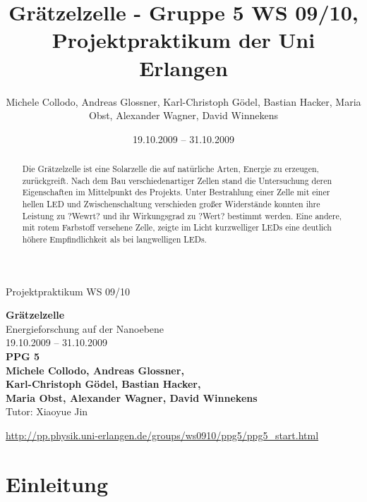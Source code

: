 \documentclass[11pt]{scrartcl}
\title{Gr\"atzelzelle - Gruppe 5 WS 09/10, Projektpraktikum der Uni Erlangen}
\date{19.10.2009 -- 31.10.2009}
\author{Michele Collodo, Andreas Glossner, Karl-Christoph G\"odel, Bastian Hacker, Maria Obst, Alexander Wagner, David Winnekens}
\begin{document}
\sloppy %
\thispagestyle{empty}
\large{Projektpraktikum WS 09/10}
\hfill
{}
\\[8\baselineskip]
\begin{center}
{\Huge\textbf{Gr\"atzelzelle}}
\\[0.5\baselineskip]
{\large Energieforschung auf der Nanoebene}
\\[1.5\baselineskip]
{\Large 19.10.2009 -- 31.10.2009}
\\[6\baselineskip]
{\huge\textbf{PPG 5}}\\[0.5\baselineskip]
{\large\textbf{
Michele Collodo,
Andreas Glossner,\\
Karl-Christoph G\"odel,
Bastian Hacker,\\
Maria Obst,
Alexander Wagner,
David Winnekens}\\
Tutor: Xiaoyue Jin}
\vfill



\small{\url{http://pp.physik.uni-erlangen.de/groups/ws0910/ppg5/ppg5\_start.html}}
\end{center}
\newpage



\tableofcontents
\vfill



\begin{abstract}
Die Gr\"atzelzelle ist eine Solarzelle die auf nat\"urliche Arten, Energie zu erzeugen, zur\"uckgreift. Nach dem Bau verschiedenartiger Zellen stand die Untersuchung deren Eigenschaften im Mittelpunkt des Projekts. Unter Bestrahlung einer Zelle mit einer hellen LED und Zwischenschaltung verschieden gro\ss{}er Widerst\"ande konnten ihre Leistung zu ?Wewrt? und ihr Wirkungsgrad zu ?Wert? bestimmt werden. Eine andere, mit rotem Farbstoff versehene Zelle, zeigte im Licht kurzwelliger LEDs eine deutlich h\"ohere Empfindlichkeit als bei langwelligen LEDs.

\end{abstract}
\newpage





\section{Einleitung}
\end{document}

